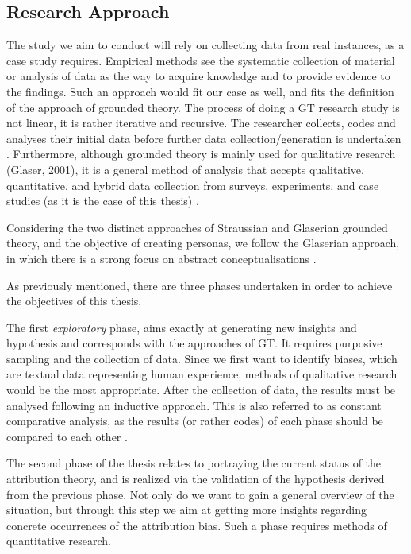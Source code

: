 \subsection{Research Approach} \label{ResearchApproach}

The study we aim to conduct will rely on collecting data from real instances, as a case study requires. Empirical methods see the systematic collection of material or analysis of data as the way to acquire knowledge and to provide evidence to the findings. Such an approach would fit our case as well, and fits the definition of the approach of grounded theory. The process of doing a GT research study is not linear, it is rather iterative and recursive. The researcher collects, codes and analyses their initial data before further data collection/generation is undertaken \cite{Chun2019}. Furthermore, although grounded theory is mainly used for qualitative research (Glaser, 2001), it is a
general method of analysis that accepts qualitative, quantitative, and hybrid data collection from surveys, experiments, and case studies (as it is the case of this thesis) \cite{Glaser1978}.

Considering the two distinct approaches of Straussian and Glaserian grounded theory, and the objective of creating personas, we follow the Glaserian approach, in which there is a strong focus on abstract conceptualisations \cite{Fernandez2004}.

As previously mentioned, there are three phases undertaken in order to achieve the objectives of this thesis.

The first \textit{exploratory} phase, aims exactly at generating new insights and hypothesis and corresponds with the approaches of GT. It requires purposive sampling and the collection of data. Since we first want to identify biases, which are textual data representing human experience, methods of qualitative research would be the most appropriate. After the collection of data, the results must be analysed following an inductive approach. This is also referred to as constant comparative analysis, as the results (or rather codes) of each phase should be compared to each other \cite{Chun2019}. 

The second phase of the thesis relates to portraying the current status of the attribution theory, and is realized via the validation of the hypothesis derived from the previous phase. Not only do we want to gain a general overview of the situation, but through this step we aim at getting more insights regarding concrete occurrences of the attribution bias. Such a phase requires methods of quantitative research. 

